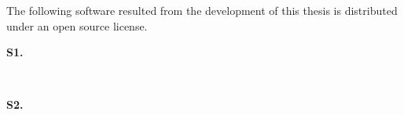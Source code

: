 The following software resulted from the development of this thesis is
distributed under an open source license.

\begin{description}
  \item[\textbf{S1.}]~~\cite{rodriguesnasf4niopy}

  \item[\textbf{S2.}]~~\cite{rodrigueshascodemodels}
\end{description}